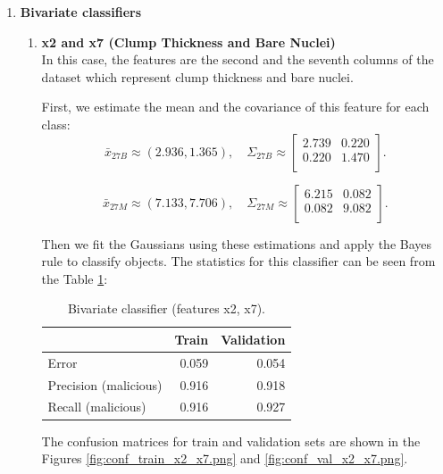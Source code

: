\documentclass[11pt,a4paper]{article}
\begin{document}
\begin{enumerate}
\begin{enumerate}
	\end{enumerate}

	\item \textbf{Bivariate classifiers}
	\begin{enumerate}
		\item \textbf {x2 and x7 (Clump Thickness and Bare Nuclei)} \\
		In this case, the features are the second and the seventh columns of the dataset which represent clump thickness and bare nuclei.
		
		First, we estimate the mean and the covariance of this feature for each class:
		\[
		\bar{x}_{27B} \approx (2.936,  1.365), \quad 
		\Sigma_{27B} \approx 
		\begin{bmatrix}
		2.739 & 0.220   \\
		0.220 & 1.470   \\
		\end{bmatrix}.
		\]
		
		\[
		\bar{x}_{27M} \approx (7.133,  7.706), \quad 
		\Sigma_{27M} \approx 
		\begin{bmatrix}
		6.215 & 0.082   \\
		0.082 & 9.082   \\
		\end{bmatrix}.
		\]
		
		Then we fit the Gaussians using these estimations and apply the Bayes rule to classify objects.
		The statistics for this classifier can be seen from the Table \ref{tab:results-x2-x7}:
		
		\begin{table}[H]
			\centering
			\begin{tabular}{lrr}
				\toprule
				& \textbf{Train} & \textbf{Validation}  \\ \midrule
				Error & 0.059 & 0.054 \\	
				Precision (malicious) & 0.916 &0.918 \\
				Recall (malicious) & 0.916 & 0.927 \\
				\bottomrule
			\end{tabular}
			\caption{Bivariate classifier (features x2, x7).}
			\label{tab:results-x2-x7}
		\end{table}
		
		The confusion matrices for train and validation sets are shown in the Figures \ref{fig:conf_train_x2_x7.png} and \ref{fig:conf_val_x2_x7.png}.
		

\end{enumerate}
\end{enumerate}
\end{document}
